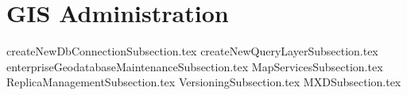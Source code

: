 
\section{GIS Administration}
{createNewDbConnectionSubsection.tex}
\clearpage
{createNewQueryLayerSubsection.tex}
\clearpage
{enterpriseGeodatabaseMaintenanceSubsection.tex}
\clearpage
{MapServicesSubsection.tex}
\clearpage
{ReplicaManagementSubsection.tex}
\clearpage
{VersioningSubsection.tex}
\clearpage
{MXDSubsection.tex}


